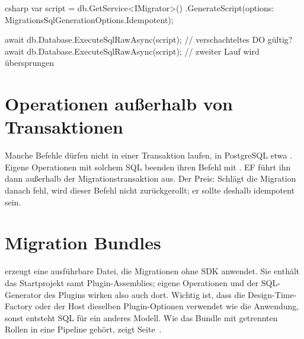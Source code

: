 \begin{sourcecode}{csharp}
var script = db.GetService<IMigrator>()
    .GenerateScript(options: MigrationsSqlGenerationOptions.Idempotent);

await db.Database.ExecuteSqlRawAsync(script);   // verschachteltes DO gültig?
await db.Database.ExecuteSqlRawAsync(script);   // zweiter Lauf wird übersprungen
\end{sourcecode}

\section{Operationen außerhalb von Transaktionen}

Manche Befehle dürfen nicht in einer Transaktion laufen, in PostgreSQL etwa . Eigene Operationen mit solchem SQL beenden ihren Befehl mit
. EF führt ihn dann außerhalb der
Migrationstransaktion aus. Der Preis: Schlägt die Migration danach fehl, wird dieser Befehl
nicht zurückgerollt; er sollte deshalb idempotent sein.

\section{Migration Bundles}

 erzeugt eine ausführbare Datei, die Migrationen ohne SDK
anwendet. Sie enthält das Startprojekt samt Plugin-Assemblies; eigene Operationen und der
SQL-Generator des Plugins wirken also auch dort. Wichtig ist, dass die Design-Time-Factory
oder der Host dieselben Plugin-Optionen verwendet wie die Anwendung, sonst entsteht SQL für
ein anderes Modell. Wie das Bundle mit getrennten Rollen in eine Pipeline gehört, zeigt
Seite~\pageref{sec:deployment}.

